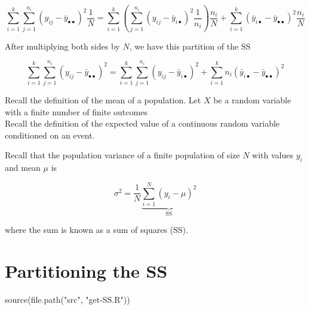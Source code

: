 \documentclass[
]{book}
\newenvironment{Shaded}{\begin{snugshade}}{\end{snugshade}}
\newcommand{\FunctionTok}[1]{\textcolor[rgb]{0.00,0.00,0.00}{#1}}
\newcommand{\NormalTok}[1]{#1}
\newcommand{\StringTok}[1]{\textcolor[rgb]{0.31,0.60,0.02}{#1}}
\begin{document}
\begin{equation}
\label{eqn:EVE2.3}
\sum_{i=1}^{k} \sum_{j = 1}^{n_i} \left( y_{ij} - \bar{y}_{\bullet\bullet} \right)^2 \frac{1}{N} = \sum_{i=1}^{k} \left( \sum_{j = 1}^{n_i} \left(y_{ij} - \bar{y}_{i \bullet} \right)^2 \frac{1}{n_i} \right) \frac{n_i}{N} +
\sum_{i=1}^{k} \left( \bar{y}_{i \bullet} - \bar{y}_{\bullet\bullet} \right)^2 \frac{n_i}{N}
\end{equation}

After multiplying both sides by \(N\), we have this partition of the \(\text{SS}\)

\begin{equation}
\label{eqn:EVE2.4}
\sum_{i=1}^{k} \sum_{j = 1}^{n_i} \left( y_{ij} - \bar{y}_{\bullet\bullet} \right)^2 = \sum_{i=1}^{k} \sum_{j = 1}^{n_i} \left(y_{ij} - \bar{y}_{i \bullet} \right)^2 +
\sum_{i=1}^{k} n_i\left( \bar{y}_{i \bullet} - \bar{y}_{\bullet\bullet} \right)^2 
\end{equation}

Recall \autocite{expected_val} the definition of the mean of a population. Let \(X\) be a random variable with a finite number of finite outcomes\\

Recall \autocite{conditional_expected_val1}\autocite{conditional_expected_val2} the definition of the expected value of a continuous random variable conditioned on an event.

Recall \autocite{variance} that the population variance of a finite population of size \(N\) with values \(y_i\) and mean \(\mu\) is

\begin{equation}
\label{eqn:pop_var}
\sigma^2 = \frac{1}{N} \underbrace{\sum_{i = 1}^{N} \left(y_i-\mu\right)^2}_{\text{SS}}
\end{equation}

where the sum is known as a sum of squares (SS).

\hypertarget{partitioning-the-ss}{%
\section{Partitioning the SS}\label{partitioning-the-ss}}

\begin{Shaded}
\begin{Highlighting}[]
\FunctionTok{source}\NormalTok{(}\FunctionTok{file.path}\NormalTok{(}\StringTok{"src"}\NormalTok{, }\StringTok{"get{-}SS.R"}\NormalTok{))}
\end{Highlighting}
\end{Shaded}
\end{document}
